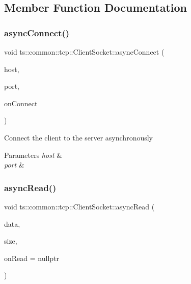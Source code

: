 \subsection{Member Function Documentation}
\mbox{\label{classts_1_1common_1_1tcp_1_1_client_socket_a6e852eb6629afd2fa253ccd3fd8a591a}} 
\subsubsection{\texorpdfstring{async\+Connect()}{asyncConnect()}}
{\footnotesize\ttfamily void ts\+::common\+::tcp\+::\+Client\+Socket\+::async\+Connect (\begin{DoxyParamCaption}\item[{std\+::string const \&}]{host,  }\item[{unsigned short}]{port,  }\item[{On\+Connect\+Func}]{on\+Connect }\end{DoxyParamCaption})}

Connect the client to the server asynchronously 
\begin{DoxyParams}{Parameters}
{\em host} & \\
\hline
{\em port} & \\
\hline
\end{DoxyParams}
\mbox{\label{classts_1_1common_1_1tcp_1_1_client_socket_afea6b565d0621b6d19648c0259b85e95}} 
\subsubsection{\texorpdfstring{async\+Read()}{asyncRead()}}
{\footnotesize\ttfamily void ts\+::common\+::tcp\+::\+Client\+Socket\+::async\+Read (\begin{DoxyParamCaption}\item[{void $\ast$}]{data,  }\item[{size\+\_\+t}]{size,  }\item[{On\+Read\+Func}]{on\+Read = {\ttfamily nullptr} }\end{DoxyParamCaption})}

